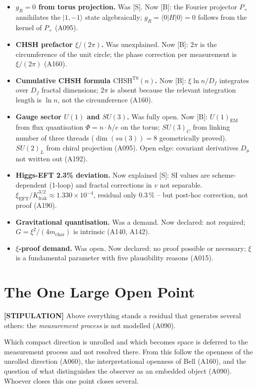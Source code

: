 \begin{itemize}[leftmargin=2em,itemsep=3pt,topsep=3pt]
  \item \textbf{$g_R=0$ from torus projection.} Was [S]. Now [B]: the Fourier
    projector $P_+$ annihilates the $|1,-1\rangle$ state algebraically;
    $g_R=\langle0|H|0\rangle=0$ follows from the kernel of $P_+$ (A095).
  \item \textbf{CHSH prefactor $\xi/(2\pi)$.} Was unexplained. Now [B]:
    $2\pi$ is the circumference of the unit circle; the phase correction per
    measurement is $\xi/(2\pi)$ (A160).
  \item \textbf{Cumulative CHSH formula $\text{CHSH}^{\text{T0}}(n)$.} Now [B]:
    $\xi\ln n/D_f$ integrates over $D_f$ fractal dimensions; $2\pi$ is absent
    because the relevant integration length is $\ln n$, not the circumference (A160).
  \item \textbf{Gauge sector $U(1)$ and $SU(3)$.} Was fully open. Now [B]:
    $U(1)_\text{EM}$ from flux quantisation $\Phi=n\cdot h/e$ on the torus;
    $SU(3)_C$ from linking number of three threads ($\dim(su(3))=8$ geometrically
    proved). $SU(2)_L$ from chiral projection (A095). Open edge: covariant
    derivatives $D_\mu$ not written out (A192).
  \item \textbf{Higgs-EFT 2.3\% deviation.} Now explained [S]: SI values are
    scheme-dependent (1-loop) and fractal corrections in $v$ not separable.
    $\xi_\text{EFT}/K_\text{frak}^{3/2}\approx1{.}330\times10^{-4}$, residual
    only 0.3\,\% -- but post-hoc correction, not proof (A190).
  \item \textbf{Gravitational quantisation.} Was a demand. Now declared:
    not required; $G=\xi^2/(4m_\text{char})$ is intrinsic (A140, A142).
  \item \textbf{$\xi$-proof demand.} Was open. Now declared: no proof possible
    or necessary; $\xi$ is a fundamental parameter with five plausibility
    reasons (A015).
\end{itemize}

\section{The One Large Open Point}

\textbf{[STIPULATION]} Above everything stands a residual that generates several
others: the \emph{measurement process} is not modelled (A090).

Which compact direction is unrolled and which becomes space is deferred to the
measurement process and not resolved there. From this follow the openness of the
unrolled direction (A060), the interpretational openness of Bell (A160), and the
question of what distinguishes the observer as an embedded object (A090). Whoever
closes this one point closes several.

